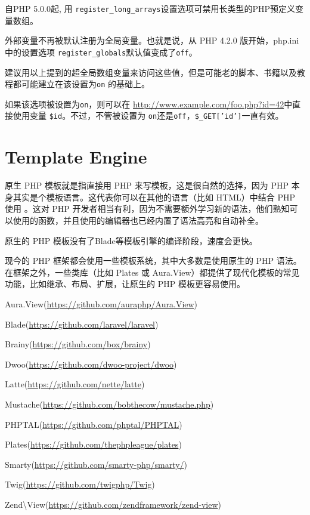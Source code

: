 自PHP 5.0.0起, 用 \texttt{register\_long\_arrays}设置选项可禁用长类型的PHP预定义变量数组。


\begin{compactitem}
\item 外部变量不再被默认注册为全局变量。也就是说，从 PHP 4.2.0 版开始，php.ini 中的设置选项 \texttt{register\_globals}默认值变成了\texttt{off}。

\end{compactitem}

建议用以上提到的超全局数组变量来访问这些值，但是可能老的脚本、书籍以及教程都可能建立在该设置为\texttt{on} 的基础上。

如果该选项被设置为\texttt{on}，则可以在 \url{http://www.example.com/foo.php?id=42}中直接使用变量 \texttt{\$id}。不过，不管被设置为 \texttt{on}还是\texttt{off}，\texttt{\$\_GET['id']}一直有效。



\section{Template Engine}

原生 PHP 模板就是指直接用 PHP 来写模板，这是很自然的选择，因为 PHP 本身其实是个模板语言。这代表你可以在其他的语言（比如 HTML）中结合 PHP 使用 。这对 PHP 开发者相当有利，因为不需要额外学习新的语法，他们熟知可以使用的函数，并且使用的编辑器也已经内置了语法高亮和自动补全。

原生的 PHP 模板没有了Blade等模板引擎的编译阶段，速度会更快。

现今的 PHP 框架都会使用一些模板系统，其中大多数是使用原生的 PHP 语法。在框架之外，一些类库（比如 Plates 或 Aura.View）都提供了现代化模板的常见功能，比如继承、布局、扩展，让原生的 PHP 模板更容易使用。

\begin{compactitem}
\item Aura.View(\url{https://github.com/auraphp/Aura.View})
\item Blade(\url{https://github.com/laravel/laravel})
\item Brainy(\url{https://github.com/box/brainy})
\item Dwoo(\url{https://github.com/dwoo-project/dwoo})
\item Latte(\url{https://github.com/nette/latte})
\item Mustache(\url{https://github.com/bobthecow/mustache.php})
\item PHPTAL(\url{https://github.com/phptal/PHPTAL})
\item Plates(\url{https://github.com/thephpleague/plates})
\item Smarty(\url{https://github.com/smarty-php/smarty/})
\item Twig(\url{https://github.com/twigphp/Twig})
\item Zend\textbackslash View(\url{https://github.com/zendframework/zend-view})
\end{compactitem}

